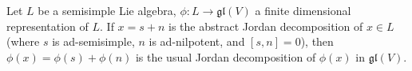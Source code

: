Let $L$ be a semisimple Lie algebra, $\phi: L \rightarrow \mathfrak{gl}(V)$ a finite dimensional representation of $L$. If $x = s + n$ is the abstract Jordan decomposition of $x \in L$ (where $s$ is ad-semisimple, $n$ is ad-nilpotent, and $[s, n] = 0$), then $\phi(x) = \phi(s) + \phi(n)$ is the usual Jordan decomposition of $\phi(x)$ in $\mathfrak{gl}(V)$.
